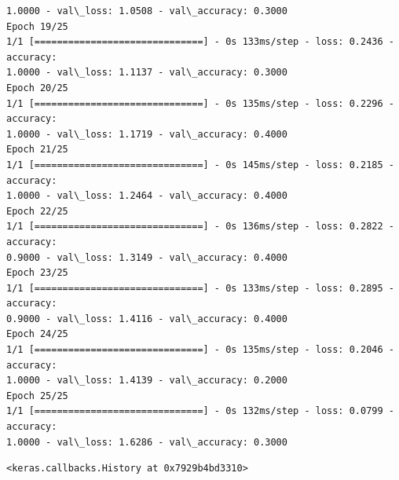 \documentclass[11pt]{article}
\makeatletter
\newcommand{\boxspacing}{\kern\kvtcb@left@rule\kern\kvtcb@boxsep}
\newcommand{\prompt}[4]{
        {\ttfamily\llap{{\color{#2}[#3]:\hspace{3pt}#4}}\vspace{-\baselineskip}}
    }
\makeatother
\begin{document}
\begin{Verbatim}[commandchars=\\\{\}]
1.0000 - val\_loss: 1.0508 - val\_accuracy: 0.3000
Epoch 19/25
1/1 [==============================] - 0s 133ms/step - loss: 0.2436 - accuracy:
1.0000 - val\_loss: 1.1137 - val\_accuracy: 0.3000
Epoch 20/25
1/1 [==============================] - 0s 135ms/step - loss: 0.2296 - accuracy:
1.0000 - val\_loss: 1.1719 - val\_accuracy: 0.4000
Epoch 21/25
1/1 [==============================] - 0s 145ms/step - loss: 0.2185 - accuracy:
1.0000 - val\_loss: 1.2464 - val\_accuracy: 0.4000
Epoch 22/25
1/1 [==============================] - 0s 136ms/step - loss: 0.2822 - accuracy:
0.9000 - val\_loss: 1.3149 - val\_accuracy: 0.4000
Epoch 23/25
1/1 [==============================] - 0s 133ms/step - loss: 0.2895 - accuracy:
0.9000 - val\_loss: 1.4116 - val\_accuracy: 0.4000
Epoch 24/25
1/1 [==============================] - 0s 135ms/step - loss: 0.2046 - accuracy:
1.0000 - val\_loss: 1.4139 - val\_accuracy: 0.2000
Epoch 25/25
1/1 [==============================] - 0s 132ms/step - loss: 0.0799 - accuracy:
1.0000 - val\_loss: 1.6286 - val\_accuracy: 0.3000
    \end{Verbatim}

            \begin{tcolorbox}[breakable, size=fbox, boxrule=.5pt, pad at break*=1mm, opacityfill=0]
\prompt{Out}{outcolor}{ }{\boxspacing}
\begin{Verbatim}[commandchars=\\\{\}]
<keras.callbacks.History at 0x7929b4bd3310>
\end{Verbatim}
\end{tcolorbox}
        
\end{document}
